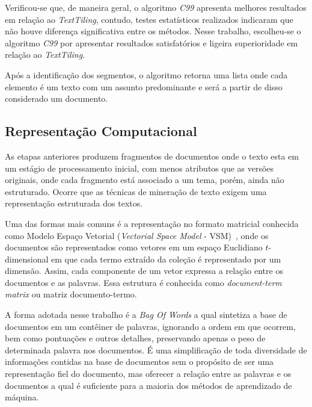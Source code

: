 Verificou-se que, de maneira geral, o algoritmo \textit{C99} apresenta melhores resultados em relação ao \textit{TextTiling}, contudo, testes estatísticos realizados indicaram que não houve diferença significativa entre os métodos. Nesse trabalho, escolheu-se o algoritmo \textit{C99} por apresentar resultados satisfatórios e ligeira superioridade em relação ao \textit{TextTiling}. 






Após a identificação dos segmentos, o algoritmo retorna uma lista onde cada elemento é um texto com um assunto predominante e será a partir de disso considerado um documento.







\subsection{Representação Computacional}

As etapas anteriores produzem fragmentos de documentos onde o texto esta em um estágio de processamento inicial, com menos atributos que as versões originais, onde cada fragmento está associado a um tema, porém, ainda não estruturado. Ocorre que as técnicas de mineração de texto exigem uma representação estruturada dos textos. %

Uma das formas mais comuns é a representação no formato matricial conhecida como Modelo Espaço Vetorial (\textit{Vectorial Space Model} - VSM)~\cite{Rezende2003}, onde os documentos são representados como vetores em um espaço Euclidiano $t$-dimensional em que cada termo extraído da coleção é representado por um dimensão. Assim, cada componente de um vetor expressa a relação entre os documentos e as palavras. Essa estrutura é conhecida como \textit{document-term matrix} ou matriz documento-termo.

A forma adotada nesse trabalho é a \textit{Bag Of Words} a qual sintetiza a base de documentos em um contêiner de palavras, ignorando a ordem em que ocorrem, bem como pontuações e outros detalhes, preservando apenas o peso de determinada palavra nos documentos. É uma simplificação de toda diversidade de informações contidas na base de documentos sem o propósito de ser uma representação fiel do documento, mas oferecer a relação entre as palavras e os documentos a qual é suficiente para a maioria dos métodos de aprendizado de máquina.%

